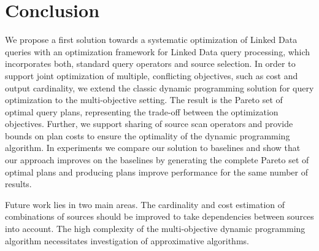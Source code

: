 \section{Conclusion}
\label{sec:conclusion}

We propose a first solution towards a systematic optimization of
Linked Data queries with an optimization framework for Linked Data
query processing, which incorporates both, standard query operators
and source selection. In order to support joint optimization of
multiple, conflicting objectives, such as cost and output cardinality,
we extend the classic dynamic programming solution for query
optimization to the multi-objective setting. The result is the Pareto
set of optimal query plans, representing the trade-off between the
optimization objectives. Further, we support sharing of source scan
operators and provide bounds on plan costs to ensure the optimality of
the dynamic programming algorithm. In experiments we compare our
solution to baselines and show that our approach improves on the
baselines by generating the complete Pareto set of optimal plans and
producing plans improve performance for the same number of results.

Future work lies in two main areas. The cardinality and cost
estimation of combinations of sources should be improved to take
dependencies between sources into account. The high complexity of the
multi-objective dynamic programming algorithm necessitates
investigation of approximative algorithms.

